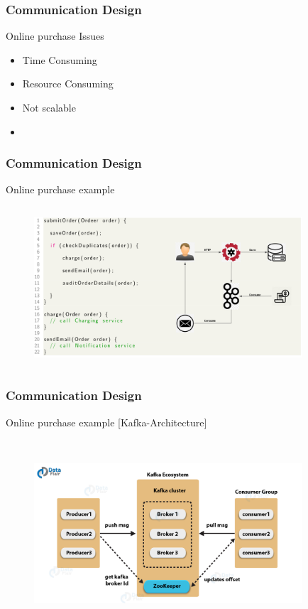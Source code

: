 \documentclass{beamer}
\begin{document}
	\begin{frame}
		\frametitle{Communication Design}
		Online purchase Issues
		\begin{itemize}
			\item<2-> \scriptsize{\alert{Time Consuming}}
			\item<3-> \scriptsize{\alert{Resource Consuming}} 
			\item<4-> \scriptsize{\alert{Not scalable}}
			
			\item<1->[] 
			
		\end{itemize}
		\vspace{100mm}
	\end{frame}

	\begin{frame}
		\frametitle{Communication Design}
		Online purchase example
		\begin{figure}[h]
			\includegraphics[width=100mm,height= 60mm, scale=1]{img/order-flow.png}
		\end{figure}
		\vspace{100mm}
	\end{frame}

	\begin{frame}
		\frametitle{Communication Design}
		Online purchase example [Kafka-Architecture]
		\begin{figure}[h]
			\includegraphics[width=100mm,height= 70mm, scale=1]{img/kafka-architecture.png}
		\end{figure}
		\vspace{100mm}
	\end{frame}
\end{document}
